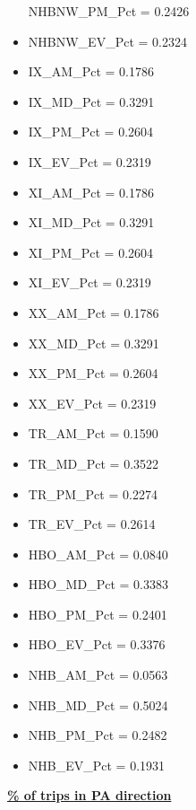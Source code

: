 \documentclass[
  letterpaper,
  DIV=11,
  numbers=noendperiod,
  titlepage=false]{scrreprt}
\begin{document}
\begin{itemize}
  NHBNW\_PM\_Pct = 0.2426
\item
  NHBNW\_EV\_Pct = 0.2324
\item
  IX\_AM\_Pct = 0.1786
\item
  IX\_MD\_Pct = 0.3291
\item
  IX\_PM\_Pct = 0.2604
\item
  IX\_EV\_Pct = 0.2319
\item
  XI\_AM\_Pct = 0.1786
\item
  XI\_MD\_Pct = 0.3291
\item
  XI\_PM\_Pct = 0.2604
\item
  XI\_EV\_Pct = 0.2319
\item
  XX\_AM\_Pct = 0.1786
\item
  XX\_MD\_Pct = 0.3291
\item
  XX\_PM\_Pct = 0.2604
\item
  XX\_EV\_Pct = 0.2319
\item
  TR\_AM\_Pct = 0.1590
\item
  TR\_MD\_Pct = 0.3522
\item
  TR\_PM\_Pct = 0.2274
\item
  TR\_EV\_Pct = 0.2614\\
\item
  HBO\_AM\_Pct = 0.0840
\item
  HBO\_MD\_Pct = 0.3383
\item
  HBO\_PM\_Pct = 0.2401
\item
  HBO\_EV\_Pct = 0.3376
\item
  NHB\_AM\_Pct = 0.0563
\item
  NHB\_MD\_Pct = 0.5024
\item
  NHB\_PM\_Pct = 0.2482
\item
  NHB\_EV\_Pct = 0.1931
\end{itemize}

\textbf{\underline{\% of trips in PA direction}}
\end{document}
